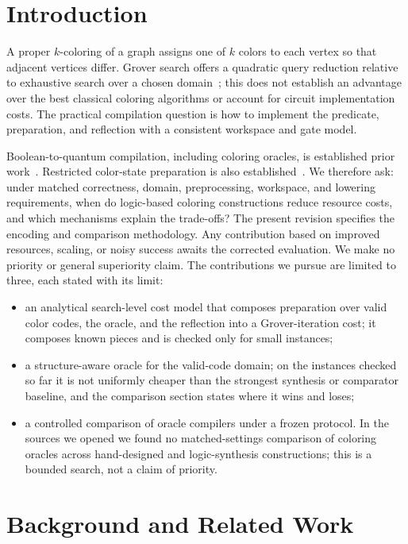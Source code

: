 \documentclass[sigconf, natbib]{acmart}
\begin{document}
\section{Introduction}
\label{sec:introduction}
A proper $k$-coloring of a graph assigns one of $k$ colors to each vertex so that adjacent vertices differ. Grover search offers a quadratic query reduction relative to exhaustive search over a chosen domain~\cite{grover}; this does not establish an advantage over the best classical coloring algorithms or account for circuit implementation costs. The practical compilation question is how to implement the predicate, preparation, and reflection with a consistent workspace and gate model.

Boolean-to-quantum compilation, including coloring oracles, is established prior work~\cite{DATE21}. Restricted color-state preparation is also established~\cite{MukherjeeList,LevinUniform}. We therefore ask: under matched correctness, domain, preprocessing, workspace, and lowering requirements, when do logic-based coloring constructions reduce resource costs, and which mechanisms explain the trade-offs? The present revision specifies the encoding and comparison methodology. Any contribution based on improved resources, scaling, or noisy success awaits the corrected evaluation. We make no priority or general superiority claim. The contributions we pursue are limited to three, each stated with its limit:
\begin{itemize}
\item an analytical search-level cost model that composes preparation over valid color codes, the oracle, and the reflection into a Grover-iteration cost; it composes known pieces and is checked only for small instances;
\item a structure-aware oracle for the valid-code domain; on the instances checked so far it is not uniformly cheaper than the strongest synthesis or comparator baseline, and the comparison section states where it wins and loses;
\item a controlled comparison of oracle compilers under a frozen protocol. In the sources we opened we found no matched-settings comparison of coloring oracles across hand-designed and logic-synthesis constructions; this is a bounded search, not a claim of priority.
\end{itemize}

\section{Background and Related Work}
\label{sec:background}
\end{document}

